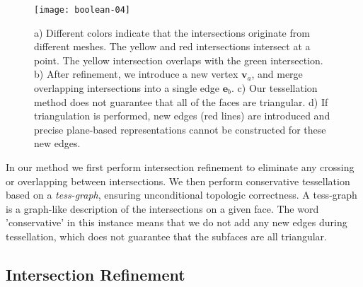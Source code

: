 \begin{figure}[t]
\centering
\texttt{[image: boolean-04]}
\caption{a) Different colors indicate that the intersections originate from different meshes. The yellow and red intersections intersect at a point. The yellow intersection overlaps with the green intersection. b) After refinement, we introduce a new vertex $\bm{v}_a$, and merge overlapping intersections into a single edge $\bm{e}_b$. c) Our tessellation method does not guarantee that all of the faces are triangular. d) If triangulation is performed, new edges (red lines) are introduced and precise plane-based representations cannot be constructed for these new edges.}
\label{fig:iisect}
\end{figure}


In our method we first perform intersection refinement to eliminate any crossing or overlapping between intersections. We then perform conservative tessellation based on a \emph{tess-graph}, ensuring unconditional topologic correctness. A tess-graph is a graph-like description of the intersections on a given face. The word 'conservative' in this instance means that we do not add any new edges during tessellation, which does not guarantee that the subfaces are all triangular.

\subsection{Intersection Refinement}

